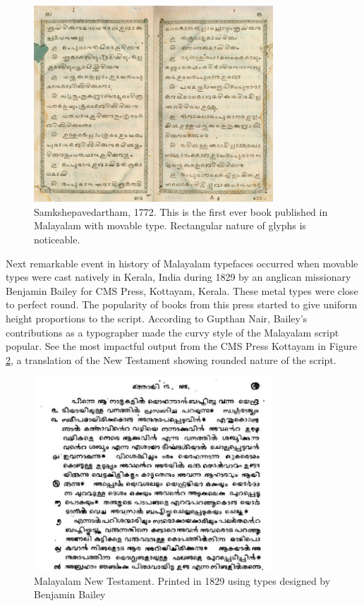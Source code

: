 \documentclass[11pt,twoside,a4paper,parskip=half]{scrartcl}
\begin{document}
\begin{figure}[h!]
	\includegraphics[width=0.8\textwidth]{images/samkshepavedartham1772.png}
	\caption{Samkshepavedartham, 1772. This is the first ever book published in Malayalam with movable type. Rectangular nature of glyphs is noticeable.}
	\label{Samkshepam}
\end{figure} 

Next remarkable event in history of Malayalam typefaces occurred when movable types were cast natively in Kerala, India during 1829 by an anglican missionary Benjamin Bailey\citep{babucherian} for CMS Press, Kottayam, Kerala. These metal types were close to perfect round. The popularity of books from this press started to give uniform height proportions to the script. According to Gupthan Nair, Bailey's contributions as a typographer made the curvy style of the Malayalam script popular\citep{gupthannair}. See the most impactful output from the CMS Press Kottayam in Figure \ref{newtestament}, a translation of the New Testament showing rounded nature of the script.


\begin{figure}[h!]
	\includegraphics[width=0.8\textwidth]{images/newtestament1829.png}
	\caption{Malayalam New Testament. Printed in 1829 using types designed by Benjamin Bailey }
	\label{newtestament}
\end{figure}
\end{document}
